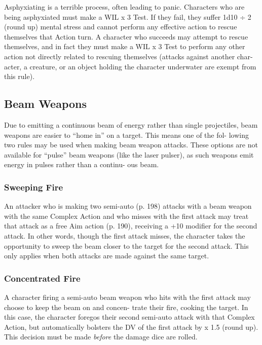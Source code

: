 Asphyxiating is a terrible process, often leading to 
panic. Characters who are being asphyxiated must 
make a WIL x 3 Test. If they fail, they suffer 1d10 
÷ 2 (round up) mental stress and cannot perform 
any effective action to rescue themselves that Action 
turn. A character who succeeds may attempt to rescue 
themselves, and in fact they must make a WIL x 3 
Test to perform any other action not directly related 
to rescuing themselves (attacks against another char-
acter, a creature, or an object holding the character 
underwater are exempt from this rule).

\subsection{Beam Weapons}

Due to emitting a continuous beam of energy rather 
than single projectiles, beam weapons are easier to 
``home in'' on a target. This means one of the fol-
lowing two rules may be used when making beam 
weapon attacks. These options are not available for 
``pulse'' beam weapons (like the laser pulser), as such 
weapons emit energy in pulses rather than a continu-
ous beam.

\subsubsection{Sweeping Fire}

An attacker who is making two semi-auto (p. 198) 
attacks with a beam weapon with the same Complex 
Action and who misses with the first attack may treat 
that attack as a free Aim action (p. 190), receiving a 
+10 modifier for the second attack. In other words, 
though the first attack misses, the character takes the 
opportunity to sweep the beam closer to the target 
for the second attack. This only applies when both 
attacks are made against the same target.

\subsubsection{Concentrated Fire}

A character firing a semi-auto beam 
weapon who hits with the first attack may 
choose to keep the beam on and concen-
trate their fire, cooking the target. In this 
case, the character foregos their second 
semi-auto attack with that Complex 
Action, but automatically bolsters the 
DV of the first attack by x 1.5 (round up). 
This decision must be made \textit{before  }the 
damage dice are rolled.

